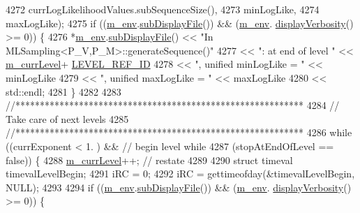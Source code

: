 \begin{DoxyCode}
{4272                                              currLogLikelihoodValues.subSequenceSize(),
4273                                              minLogLike,
4274                                              maxLogLike);
4275   \textcolor{keywordflow}{if} ((\hyperlink{class_q_u_e_s_o_1_1_m_l_sampling_a13f1ca4fe9f94822fe572a743eaced1d}{m\_env}.\hyperlink{class_q_u_e_s_o_1_1_base_environment_a8a0064746ae8dddfece4229b9ad374d6}{subDisplayFile}()) && (\hyperlink{class_q_u_e_s_o_1_1_m_l_sampling_a13f1ca4fe9f94822fe572a743eaced1d}{m\_env}.
      \hyperlink{class_q_u_e_s_o_1_1_base_environment_a1fe5f244fc0316a0ab3e37463f108b96}{displayVerbosity}() >= 0)) \{
4276     *\hyperlink{class_q_u_e_s_o_1_1_m_l_sampling_a13f1ca4fe9f94822fe572a743eaced1d}{m\_env}.\hyperlink{class_q_u_e_s_o_1_1_base_environment_a8a0064746ae8dddfece4229b9ad374d6}{subDisplayFile}() << \textcolor{stringliteral}{"In MLSampling<P\_V,P\_M>::generateSequence()"}
4277                             << \textcolor{stringliteral}{": at end of level "}      << \hyperlink{class_q_u_e_s_o_1_1_m_l_sampling_af9416874c856e50f3b35270e801f17e4}{m\_currLevel}+
      \hyperlink{_m_l_sampling_level_options_8h_a68d15eaf394d210effcf584b938206d3}{LEVEL\_REF\_ID}
4278                             << \textcolor{stringliteral}{", unified minLogLike = "} << minLogLike
4279                             << \textcolor{stringliteral}{", unified maxLogLike = "} << maxLogLike
4280                             << std::endl;
4281   \}
4282 
4283   \textcolor{comment}{//***********************************************************}
4284   \textcolor{comment}{// Take care of next levels}
4285   \textcolor{comment}{//***********************************************************}
4286   \textcolor{keywordflow}{while} ((currExponent     <  1.   ) && \textcolor{comment}{// begin level while}
4287          (stopAtEndOfLevel == \textcolor{keyword}{false})) \{
4288     \hyperlink{class_q_u_e_s_o_1_1_m_l_sampling_af9416874c856e50f3b35270e801f17e4}{m\_currLevel}++; \textcolor{comment}{// restate}
4289 
4290     \textcolor{keyword}{struct }timeval timevalLevelBegin;
4291     iRC = 0;
4292     iRC = gettimeofday(&timevalLevelBegin, NULL);
4293 
4294     \textcolor{keywordflow}{if} ((\hyperlink{class_q_u_e_s_o_1_1_m_l_sampling_a13f1ca4fe9f94822fe572a743eaced1d}{m\_env}.\hyperlink{class_q_u_e_s_o_1_1_base_environment_a8a0064746ae8dddfece4229b9ad374d6}{subDisplayFile}()) && (\hyperlink{class_q_u_e_s_o_1_1_m_l_sampling_a13f1ca4fe9f94822fe572a743eaced1d}{m\_env}.
      \hyperlink{class_q_u_e_s_o_1_1_base_environment_a1fe5f244fc0316a0ab3e37463f108b96}{displayVerbosity}() >= 0)) \{
}
\end{DoxyCode}

